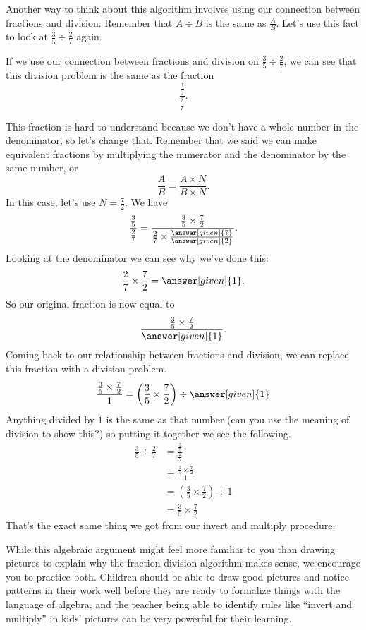 \documentclass{ximera}
\begin{document}
Another way to think about this algorithm involves using our connection between fractions and division. Remember that $A \div B$ is the same as $\frac{A}{B}$. Let's use this fact to look at $\frac{3}{5} \div \frac{2}{7}$ again.

\begin{example}
If we use our connection between fractions and division on $\frac{3}{5} \div \frac{2}{7}$, we can see that this division problem is the same as the fraction
\[
\frac{\frac35}{\frac27}.
\]

This fraction is hard to understand because we don't have a whole number in the denominator, so let's change that. Remember that we said we can make equivalent fractions by multiplying the numerator and the denominator by the same number, or 
\[
\frac{A}{B} = \frac{A \times N}{B \times N}.
\]
In this case, let's use $N = \frac{7}{2}$. We have
\[
\frac{\frac35}{\frac27} = \frac{\frac{3}{5} \times \frac{7}{2}}{\frac{2}{7} \times \frac{\answer[given]{7}}{\answer[given]{2}}}.
\]
Looking at the denominator we can see why we've done this: 
\[
\frac{2}{7} \times \frac{7}{2} = \answer[given]{1}.
\]
So our original fraction is now equal to
\[
\frac{\frac{3}{5} \times \frac{7}{2}}{\answer[given]{1}}.
\]
Coming back to our relationship between fractions and division, we can replace this fraction with a division problem.
\[
\frac{\frac{3}{5} \times \frac{7}{2}}{1} = \left ( \frac{3}{5} \times \frac{7}{2} \right ) \div \answer[given]{1}
\]
Anything divided by $1$ is the same as that number (can you use the meaning of division to show this?) so putting it together we see the following.
\begin{align*}
\frac{3}{5} \div \frac{2}{7} &= \frac{\frac35}{\frac27} \\
& = \frac{\frac{3}{5} \times \frac{7}{2}}{1} \\
&= \left ( \frac{3}{5} \times \frac{7}{2} \right ) \div 1 \\ 
&= \frac{3}{5} \times \frac{7}{2}
\end{align*}
That's the exact same thing we got from our invert and multiply procedure.
\end{example}

While this algebraic argument might feel more familiar to you than drawing pictures to explain why the fraction division algorithm makes sense, we encourage you to practice both. Children should be able to draw good pictures and notice patterns in their work well before they are ready to formalize things with the language of algebra, and the teacher being able to identify rules like ``invert and multiply'' in kids' pictures can be very powerful for their learning.
\end{document}

